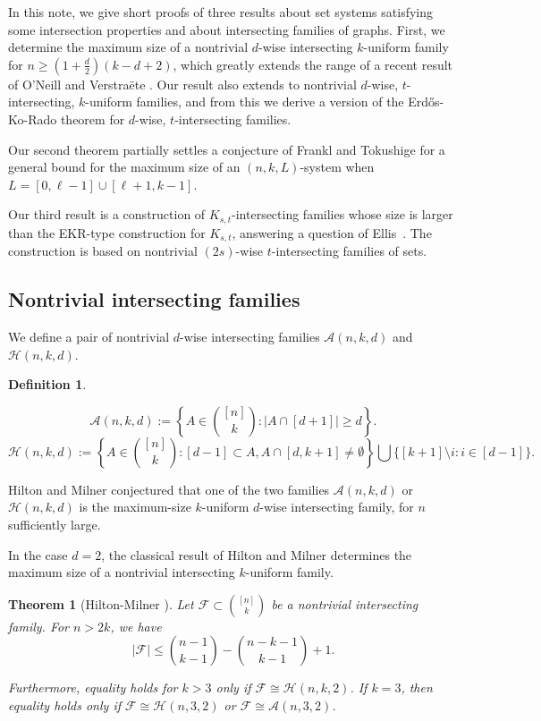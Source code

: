 \documentclass[12pt]{article}
\newtheorem{theorem}{Theorem}
\theoremstyle{definition}
\newtheorem{definition}{Definition}
\newcommand{\cH}{\mathcal{H}}
\newcommand{\cA}{\mathcal{A}}
\newcommand{\cF}{\mathcal{F}}
\begin{document}
In this note, we give short proofs of three results about set systems satisfying some intersection properties and about intersecting families of graphs. First, we determine the maximum size of a nontrivial $d$-wise intersecting $k$-uniform family for $n \ge \left(1+\frac{d}{2}\right)(k-d+2)$, which greatly extends the range of a recent result of O'Neill and Verstra\"{e}te \cite{OV}. Our result also extends to nontrivial $d$-wise, $t$-intersecting, $k$-uniform families, and from this we derive a version of the Erd\H{o}s-Ko-Rado theorem for $d$-wise, $t$-intersecting families. 

Our second theorem partially settles a conjecture of Frankl and Tokushige \cite{FT} for a general bound for the maximum size of an $(n, k, L)$-system when $L = [0, \ell - 1] \cup [\ell+1, k-1]$.  

Our third result is a construction of $K_{s, t}$-intersecting families whose size is larger than the EKR-type construction for $K_{s, t}$, answering a question of Ellis~\cite{E}. The construction is based on nontrivial $(2s)$-wise $t$-intersecting families of sets.

\subsection{Nontrivial intersecting families}

We define a pair of nontrivial $d$-wise intersecting families $\cA(n, k, d)$ and $\cH(n, k, d)$. 
\begin{definition}\label{defn:akdhkddefn}

\[\cA(n, k,d) := \left\{A\in \binom{[n]}{k}: |A\cap [d+1]| \ge d\right\}.\]
\[\cH(n, k,d) := \left\{A\in \binom{[n]}{k}: [d-1] \subset A, A\cap [d, k+1] \neq \emptyset\right\}\bigcup \bigg\{[k+1]\setminus {i}: i\in [d-1]\bigg\}.\]

\end{definition}
Hilton and Milner \cite{HM} conjectured that one of the two families $\cA(n, k, d)$ or $\cH(n, k, d)$ is the maximum-size $k$-uniform $d$-wise intersecting family, for $n$ sufficiently large. 

In the case $d=2$, the classical result of Hilton and Milner \cite{HM} determines the maximum size of a nontrivial intersecting $k$-uniform family. 

\begin{theorem}[Hilton-Milner \cite{HM}]\label{thm:hm}
Let $\cF\subset \binom{[n]}{k}$ be a nontrivial intersecting family. For $n > 2k$, we have
\[|\cF| \le \binom{n-1}{k-1} - \binom{n-k-1}{k-1} + 1.\]

Furthermore, equality holds for $k > 3$ only if $\cF \cong \cH(n, k, 2)$. If $k=3$, then equality holds only if $\cF \cong \cH(n, 3, 2)$ or $\cF \cong \cA(n, 3, 2)$. 
\end{theorem}
\end{document}
